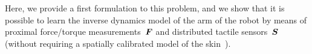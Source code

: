 %
Here, we provide a first formulation to this problem, and we show that it is possible to learn the inverse dynamics model of the arm of the \robot{} robot by means of proximal force/torque measurements~$\boldsymbol{F}$ and distributed tactile sensors~$\mathcal{\boldsymbol{S}}$ (without requiring a spatially calibrated model of the skin~\cite{DelPrete2011}). 
%
%
%

